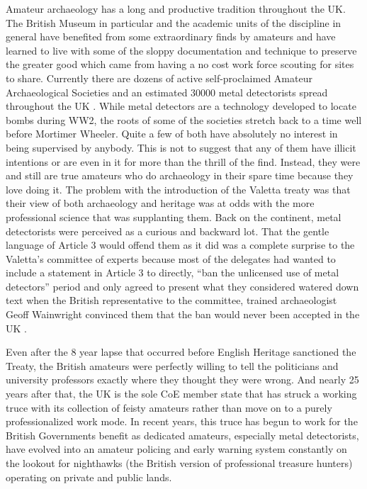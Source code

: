 \documentclass[english]{ijsra}
\begin{document}
Amateur archaeology has a long and productive tradition throughout the UK. The British Museum in particular and the academic units of the discipline in general have benefited from some extraordinary finds by amateurs and have learned to live with some of the sloppy documentation and technique to preserve the greater good which came from having a no cost work force scouting for sites to share. Currently there are dozens of active self-proclaimed Amateur Archaeological Societies and an estimated \num{30000} metal detectorists spread throughout the UK \parencites{Roeher_2006}{Potts_2015}. 
While metal detectors are a technology developed to locate bombs during WW2, the roots of some of the societies stretch back to a time well before Mortimer Wheeler. Quite a few of both have absolutely no interest in being supervised by anybody. This is not to suggest that any of them have illicit intentions or are even in it for more than the thrill of the find. Instead, they were and still are true amateurs who do archaeology in their spare time because they love doing it. The problem with the introduction of the Valetta treaty was that their view of both archaeology and heritage was at odds with the more professional science that was supplanting them. Back on the continent, metal detectorists were perceived as a curious and backward lot. That the gentle language of Article 3 would offend them as it did was a complete surprise to the Valetta’s committee of experts because most of the delegates had wanted to include a statement in Article 3 to directly, “ban the unlicensed use of metal detectors” period and only agreed to present what they considered watered down text when the British representative to the committee, trained archaeologist Geoff Wainwright convinced them that the ban would never been accepted in the UK \parencite[62]{Willems_2007}. 

Even after the 8 year lapse that occurred before English Heritage sanctioned the Treaty, the British amateurs were perfectly willing to tell the politicians and university professors exactly where they thought they were wrong. And nearly 25 years after that, the UK is the sole CoE member state that has struck a working truce with its collection of feisty amateurs rather than move on to a purely professionalized work mode. In recent years, this truce has begun to work for the British Governments benefit as dedicated amateurs, especially metal detectorists, have evolved into an amateur policing and early warning system constantly on the lookout for nighthawks (the British version of professional treasure hunters) operating on private and public lands. 
\end{document}
